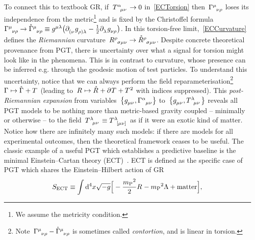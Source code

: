 \documentclass[aps,prd,reprint,preprintnumbers,showpacs,floatfix,nofootinbib,superscript address]{revtex4-2}
\begin{document}
To connect this to textbook GR, if~$\MAGT{^\alpha_\mu_\nu}\to 0$ in~\cref{ECTorsion} then~$\MAGA{^\mu_\nu_\rho}$ loses its independence from the metric\footnote{We assume the metricity condition.} and is fixed by the Christoffel formula~$\MAGA{^\mu_\nu_\rho}\to\rCon{^\mu_{\nu\rho}}\equiv\FieldG{^{\mu\lambda}}\big(\PD{_{(\nu}}\g{_{\rho)\lambda}}-\frac{1}{2}\PD{_{\lambda}}\g{_{\nu\rho}}\big)$. In this torsion-free limit,~\cref{ECCurvature} defines the \emph{Riemannian} curvature~$\MAGF{^\rho_\sigma_{\mu\nu}}\to\rR{^\rho_\sigma_{\mu\nu}}$. Despite concrete theoretical provenance from PGT, there is uncertainty over what a signal for torsion might look like in the phenomena. This is in contrast to curvature, whose presence can be inferred e.g. through the geodesic motion of test particles. To understand this uncertainty, notice that we can always perform the field reparameterisation\footnote{Note~$\MAGA{^\mu_\nu_\rho}-\rCon{^\mu_\nu_\rho}$ is sometimes called \emph{contortion}, and is linear in torsion.}~$\MAGA{}\mapsto\rCon{}+\MAGT{}$ (leading to~$\MAGF{}\mapsto\rR{}+\PD{}\MAGT{}+\MAGT{}^2$ with indices suppressed). This \emph{post-Riemannian expansion} from variables~$\big\{\FieldG{_{\mu\nu}},\MAGA{^\alpha_{\mu}_{\nu}}\big\}$ to~$\big\{\FieldG{_{\mu\nu}},\MAGT{^\lambda_{\mu\nu}}\big\}$ reveals all PGT models to be nothing more than metric-based gravity coupled -- minimally or otherwise -- to the field~$\MAGT{^\lambda_{\mu\nu}}\equiv\MAGT{^\lambda_{[\mu\nu]}}$ as if it were an exotic kind of matter. Notice how there are infinitely many such models: if there are models for all experimental outcomes, then the theoretical framework ceases to be useful. The classic example of a useful PGT which establishes a predictive baseline is the minimal Einstein--Cartan theory (ECT)~\cite{Cartan:1922,Cartan:1923,Cartan:1924,Cartan:1925,Einstein:1925, Einstein:1928,Einstein:19282}. ECT is defined as the specific case of PGT which shares the Einstein--Hilbert action of GR
\begin{equation}\label{ECT}
	S_{\text{ECT}}\equiv\int\mathrm{d}^4x\sqrt{-g}\Big[-\frac{\MPl{}^2}{2}\MAGF{}
	-\MPl{}^2\Lambda+\text{matter}\Big],
\end{equation}
\end{document}
